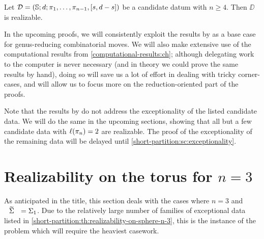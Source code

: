 \begin{theorem}\label{short-partition:th:realizability-on-sphere-n-ge-4}
Let $\mathcal{D}=(\mathbb{S}{};d;\pi_1,\ldots,\pi_{n-1},[s,d-s])$ be a candidate datum with $n\ge 4$. Then $\DD$ is realizable.
\end{theorem}
In the upcoming proofs, we will consistently exploit the results by \citeauthor{pakovich} as a base case for genus-reducing combinatorial moves. We will also make extensive use of the computational results from \cref{computational-results:ch}; although delegating work to the computer is never necessary (and in theory we could prove the same results by hand), doing so will save us a lot of effort in dealing with tricky corner-cases, and will allow us to focus more on the reduction-oriented part of the proofs.

Note that the results by \citeauthor{pakovich} do not address the exceptionality of the listed candidate data. We will do the same in the upcoming sections, showing that all but a few candidate data with $\ell(\pi_n)=2$ are realizable. The proof of the exceptionality of the remaining data will be delayed until \cref{short-partition:sc:exceptionality}.

\section{Realizability on the torus for \texorpdfstring{$n=3$}{n=3}}

As anticipated in the title, this section deals with the cases where $n=3$ and $\tSigma=\surf{1}$. Due to the relatively large number of families of exceptional data listed in \cref{short-partition:th:realizability-on-sphere-n-3}, this is the instance of the problem which will require the heaviest casework.

